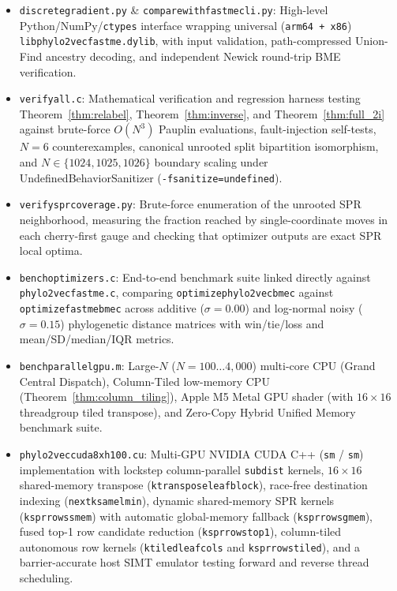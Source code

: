 \documentclass[11pt,a4paper]{article}
\makeatletter
\DeclareRobustCommand{\_}{\ifmmode\nfss@text{\textunderscore}\else\textunderscore\allowbreak\fi}
\theoremstyle{definition}
\makeatother
\begin{document}
\begin{itemize}
\begin{itemize}
    \end{itemize}
    \item \texttt{discrete\_gradient.py} \& \texttt{compare\_with\_fastme\_cli.py}: High-level Python/NumPy/\texttt{ctypes} interface wrapping universal (\texttt{arm64 + x86\_64}) \texttt{libphylo2vec\_fastme.dylib}, with input validation, path-compressed Union-Find ancestry decoding, and independent Newick round-trip BME verification.
    \item \texttt{verify\_all.c}: Mathematical verification and regression harness testing Theorem~\ref{thm:relabel}, Theorem~\ref{thm:inverse}, and Theorem~\ref{thm:full_2i} against brute-force $O(N^3)$ Pauplin evaluations, fault-injection self-tests, $N=6$ counterexamples, canonical unrooted split bipartition isomorphism, and $N \in \{1024, 1025, 1026\}$ boundary scaling under UndefinedBehaviorSanitizer (\texttt{-fsanitize=undefined}).
    \item \texttt{verify\_spr\_coverage.py}: Brute-force enumeration of the unrooted SPR neighborhood, measuring the fraction reached by single-coordinate moves in each cherry-first gauge and checking that optimizer outputs are exact SPR local optima.
    \item \texttt{bench\_optimizers.c}: End-to-end benchmark suite linked directly against \texttt{phylo2vec\_fastme.c}, comparing \texttt{optimize\_phylo2vec\_bme\_c} against \texttt{optimize\_fastme\_bme\_c} across additive ($\sigma = 0.00$) and log-normal noisy ($\sigma = 0.15$) phylogenetic distance matrices with win/tie/loss and mean/SD/median/IQR metrics.
    \item \texttt{bench\_parallel\_gpu.m}: Large-$N$ ($N = 100 \dots 4{,}000$) multi-core CPU (Grand Central Dispatch), Column-Tiled low-memory CPU (Theorem~\ref{thm:column_tiling}), Apple M5 Metal GPU shader (with $16 \times 16$ threadgroup tiled transpose), and Zero-Copy Hybrid Unified Memory benchmark suite.
    \item \texttt{phylo2vec\_cuda\_8xh100.cu}: Multi-GPU NVIDIA CUDA C++ (\texttt{sm\_90} / \texttt{sm\_100}) implementation with lockstep column-parallel \texttt{subdist} kernels, $16 \times 16$ shared-memory transpose (\texttt{k\_transpose\_leaf\_block}), race-free destination indexing (\texttt{next\_k\_same\_lmin}), dynamic shared-memory SPR kernels (\texttt{k\_spr\_rows\_smem}) with automatic global-memory fallback (\texttt{k\_spr\_rows\_gmem}), fused top-1 row candidate reduction (\texttt{k\_spr\_rows\_top1}), column-tiled autonomous row kernels (\texttt{k\_tiled\_leaf\_cols} and \texttt{k\_spr\_rows\_tiled}), and a barrier-accurate host SIMT emulator testing forward and reverse thread scheduling.
\end{itemize}
\end{document}
